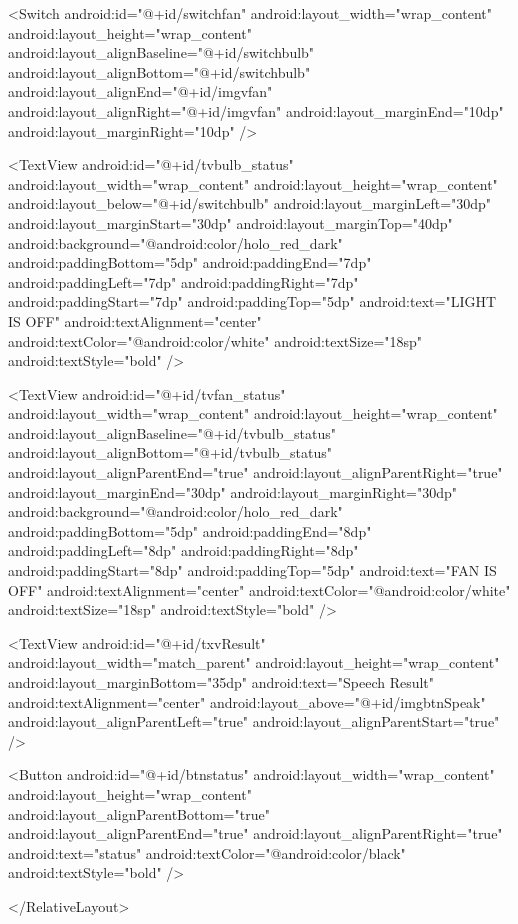     <Switch
        android:id="@+id/switchfan"
        android:layout_width="wrap_content"
        android:layout_height="wrap_content"
        android:layout_alignBaseline="@+id/switchbulb"
        android:layout_alignBottom="@+id/switchbulb"
        android:layout_alignEnd="@+id/imgvfan"
        android:layout_alignRight="@+id/imgvfan"
        android:layout_marginEnd="10dp"
        android:layout_marginRight="10dp" />

    <TextView
        android:id="@+id/tvbulb_status"
        android:layout_width="wrap_content"
        android:layout_height="wrap_content"
        android:layout_below="@+id/switchbulb"
        android:layout_marginLeft="30dp"
        android:layout_marginStart="30dp"
        android:layout_marginTop="40dp"
        android:background="@android:color/holo_red_dark"
        android:paddingBottom="5dp"
        android:paddingEnd="7dp"
        android:paddingLeft="7dp"
        android:paddingRight="7dp"
        android:paddingStart="7dp"
        android:paddingTop="5dp"
        android:text="LIGHT IS OFF"
        android:textAlignment="center"
        android:textColor="@android:color/white"
        android:textSize="18sp"
        android:textStyle="bold" />

    <TextView
        android:id="@+id/tvfan_status"
        android:layout_width="wrap_content"
        android:layout_height="wrap_content"
        android:layout_alignBaseline="@+id/tvbulb_status"
        android:layout_alignBottom="@+id/tvbulb_status"
        android:layout_alignParentEnd="true"
        android:layout_alignParentRight="true"
        android:layout_marginEnd="30dp"
        android:layout_marginRight="30dp"
        android:background="@android:color/holo_red_dark"
        android:paddingBottom="5dp"
        android:paddingEnd="8dp"
        android:paddingLeft="8dp"
        android:paddingRight="8dp"
        android:paddingStart="8dp"
        android:paddingTop="5dp"
        android:text="FAN IS OFF"
        android:textAlignment="center"
        android:textColor="@android:color/white"
        android:textSize="18sp"
        android:textStyle="bold" />

    <TextView
        android:id="@+id/txvResult"
        android:layout_width="match_parent"
        android:layout_height="wrap_content"
        android:layout_marginBottom="35dp"
        android:text="Speech Result"
        android:textAlignment="center"
        android:layout_above="@+id/imgbtnSpeak"
        android:layout_alignParentLeft="true"
        android:layout_alignParentStart="true" />

    <Button
        android:id="@+id/btnstatus"
        android:layout_width="wrap_content"
        android:layout_height="wrap_content"
        android:layout_alignParentBottom="true"
        android:layout_alignParentEnd="true"
        android:layout_alignParentRight="true"
        android:text="status"
        android:textColor="@android:color/black"
        android:textStyle="bold" />


</RelativeLayout>
